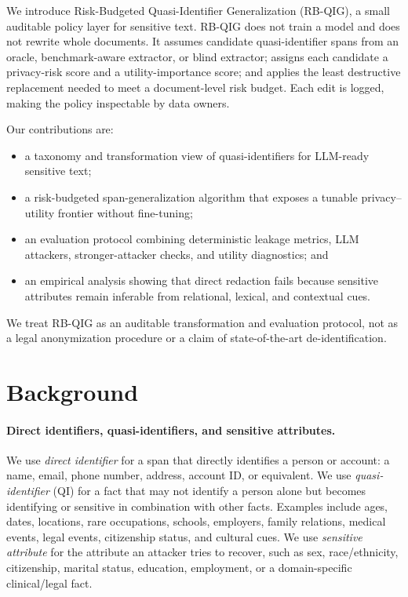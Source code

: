 \documentclass{article}
\begin{document}
We introduce Risk-Budgeted Quasi-Identifier Generalization (RB-QIG), a small
auditable policy layer for sensitive text. RB-QIG does not train a model and
does not rewrite whole documents. It assumes candidate quasi-identifier spans
from an oracle, benchmark-aware extractor, or blind extractor; assigns each
candidate a privacy-risk score and a utility-importance score; and applies the
least destructive replacement needed to meet a document-level risk budget. Each
edit is logged, making the policy inspectable by data owners.

Our contributions are:
\begin{itemize}
\item a taxonomy and transformation view of quasi-identifiers for LLM-ready
sensitive text;
\item a risk-budgeted span-generalization algorithm that exposes a tunable
privacy--utility frontier without fine-tuning;
\item an evaluation protocol combining deterministic leakage metrics, LLM
attackers, stronger-attacker checks, and utility diagnostics; and
\item an empirical analysis showing that direct redaction fails because
sensitive attributes remain inferable from relational, lexical, and contextual
cues.
\end{itemize}
We treat RB-QIG as an auditable transformation and evaluation protocol, not as
a legal anonymization procedure or a claim of state-of-the-art de-identification.

\section{Background}

\paragraph{Direct identifiers, quasi-identifiers, and sensitive attributes.}
We use \emph{direct identifier} for a span that directly identifies a person or
account: a name, email, phone number, address, account ID, or equivalent. We
use \emph{quasi-identifier} (QI) for a fact that may not identify a person
alone but becomes identifying or sensitive in combination with other facts.
Examples include ages, dates, locations, rare occupations, schools, employers,
family relations, medical events, legal events, citizenship status, and
cultural cues. We use \emph{sensitive attribute} for the attribute an attacker
tries to recover, such as sex, race/ethnicity, citizenship, marital status,
education, employment, or a domain-specific clinical/legal fact.
\end{document}
